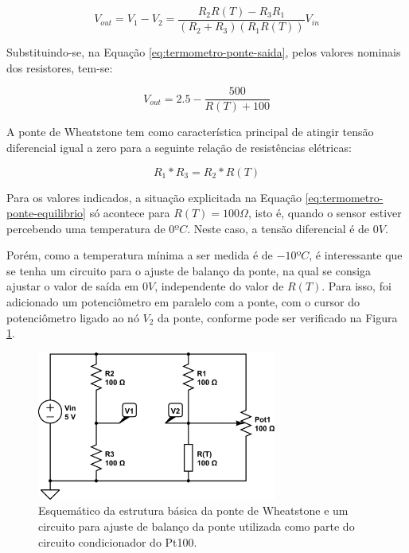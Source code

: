\documentclass[a4paper]{instrumentacao}
\begin{document}
\begin{equation}
	V_{out}=V_1-V_2=\frac{R_2R(T)-R_3R_1}{(R_2+R_3)(R_1R(T))}V_{in}
	\label{eq:termometro-ponte-saida}
\end{equation}

Substituindo-se, na Equação \ref{eq:termometro-ponte-saida}, pelos valores nominais dos resistores, tem-se:

\begin{equation}
	V_{out}=2.5-\frac{500}{R(T)+100}
	\label{eq:termometro-ponte-saida-valores}
\end{equation}

A ponte de Wheatstone tem como característica principal de atingir tensão diferencial igual a zero para a seguinte relação de resistências elétricas:

 \begin{equation}
	R_1*R_3=R_2*R(T)
	\label{eq:termometro-ponte-equilibrio}
\end{equation}

Para os valores indicados, a situação explicitada na Equação \ref{eq:termometro-ponte-equilibrio} só acontece para $R(T)=100\Omega$, isto é, quando o sensor estiver percebendo uma temperatura de $0ºC$. Neste caso, a tensão diferencial é de $0V$.

Porém, como a temperatura mínima a ser medida é de $-10ºC$, é interessante que se tenha um circuito para o ajuste de balanço da ponte, na qual se consiga ajustar o valor de   saída em $0V$, independente do valor de $R(T)$. Para isso, foi adicionado um potenciômetro em paralelo com a ponte, com o cursor do potenciômetro ligado ao nó $V_2$ da ponte, conforme pode ser verificado na Figura \ref{fig:termometro-ponte-balanco}.

\begin{figure}[H]
	\centering \includegraphics[width=0.7\textwidth]{pt100-ponte-balanco.png}
	\caption{Esquemático da estrutura básica da ponte de Wheatstone e um circuito para ajuste de balanço da ponte utilizada como parte do circuito condicionador do Pt100.}
	\label{fig:termometro-ponte-balanco}
\end{figure}
\end{document}
